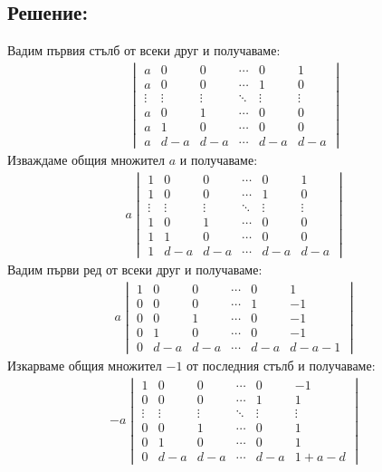 \documentclass[a4paper, 12pt, oneside]{article}
\begin{document}
\subsection*{Решение:}
Вадим първия стълб от всеки друг и получаваме:
\begin{align*}
\begin{vmatrix}
    a & 0 & 0 & \cdots & 0 & 1 \\
    a & 0 & 0 & \cdots & 1 & 0 \\
    \vdots & \vdots & \vdots & \ddots & \vdots & \vdots \\
    a & 0 & 1 & \cdots & 0 & 0 \\
    a & 1 & 0 & \cdots & 0 & 0 \\
    a & d - a & d - a & \cdots & d - a & d - a
\end{vmatrix}
\end{align*}
Изваждаме общия множител \(a\) и получаваме:
\begin{align*}
a\begin{vmatrix}
    1 & 0 & 0 & \cdots & 0 & 1 \\
    1 & 0 & 0 & \cdots & 1 & 0 \\
    \vdots & \vdots & \vdots & \ddots & \vdots & \vdots \\
    1 & 0 & 1 & \cdots & 0 & 0 \\
    1 & 1 & 0 & \cdots & 0 & 0  \\
    1 & d - a & d - a & \cdots & d - a & d - a
\end{vmatrix}
\end{align*}
Вадим първи ред от всеки друг и получаваме:
\begin{align*}
a\begin{vmatrix}
    1 & 0 & 0 & \cdots & 0 & 1 \\
    0 & 0 & 0 & \cdots & 1 & -1 \\
    0 & 0 & 1 & \cdots & 0 & -1 \\
    0 & 1 & 0 & \cdots & 0 & -1  \\
    0 & d - a & d - a & \cdots & d - a & d - a - 1
\end{vmatrix}
\end{align*}
Изкарваме общия  множител \(-1\) от последния стълб и получаваме:
\begin{align*}
-a\begin{vmatrix}
    1 & 0 & 0 & \cdots & 0 & -1 \\
    0 & 0 & 0 & \cdots & 1 & 1 \\
    \vdots & \vdots & \vdots & \ddots & \vdots & \vdots \\
    0 & 0 & 1 & \cdots & 0 & 1 \\
    0 & 1 & 0 & \cdots & 0 & 1  \\
    0 & d - a & d - a & \cdots & d - a & 1 + a - d
\end{vmatrix}
\end{align*}
\end{document}

